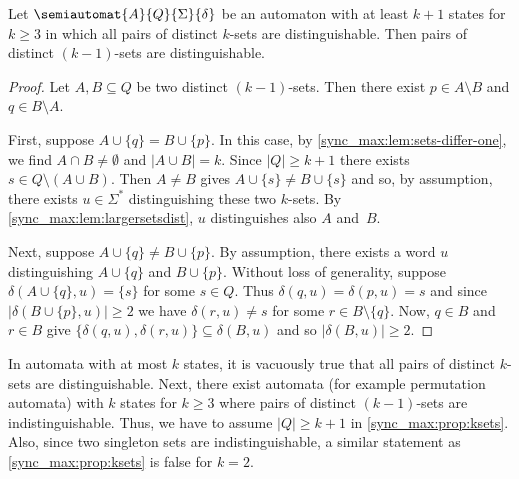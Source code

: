 \begin{proposition} \label{sync_max:prop:ksets}
	Let $\semiautomat{A}{Q}{\Sigma}{\delta}$
	be an automaton with at least $k+1$ 
	states for $k \ge 3$
	in which all pairs of distinct $k$-sets are distinguishable.
	Then pairs of distinct $(k-1)$-sets
	are distinguishable.
\end{proposition}
\begin{proof}
	Let $A,B \subseteq Q$ be two distinct
	$(k-1)$-sets. Then there exist
	$p \in A \setminus B$ and $q \in B \setminus A$.
	
	First, suppose $A \cup \{q\} = B \cup \{p\}$.
	In this case, by \cref{sync_max:lem:sets-differ-one},
	we find $A \cap B \ne \emptyset$
	and $|A \cup B| = k$.
	Since $|Q| \ge k + 1$
	there exists $s \in Q \setminus (A \cup B)$.
	Then $A \ne B$
	gives $A \cup \{s\} \ne B \cup \{s\}$
	and so, by assumption, there exists $u \in \Sigma^*$
	distinguishing these two $k$-sets.
	By \cref{sync_max:lem:largersetsdist}, $u$
	distinguishes also $A$ and~$B$.
	
	Next, suppose $A \cup \{q\} \ne B \cup \{p\}$.
	By assumption, there exists a word $u$ distinguishing
	$A  \cup \{q\}$ and $B  \cup \{p\}$.
	Without loss of generality, suppose $\delta(A \cup \{q\}, u) = \{s\}$
	for some $s \in Q$.
	Thus $\delta(q, u) = \delta(p, u) = s$
	and since $|\delta(B \cup \{p\}, u)| \ge 2$ 
	we have $\delta(r, u) \ne s$ for some $r \in B \setminus \{q\}$.
	Now, $q \in B$ and $r \in B$ 
	give $\{\delta(q, u), \delta(r, u) \} \subseteq \delta(B, u)$
	and so $|\delta(B, u)| \ge 2$.
\end{proof}

In automata with at most $k$ states, it is vacuously true
that all pairs of distinct $k$-sets are distinguishable.
Next, there exist automata (for example permutation automata)
with $k$ states for $k \ge 3$ where pairs of distinct $(k-1)$-sets
are indistinguishable.
Thus, we have to assume $|Q| \ge k + 1$ in \cref{sync_max:prop:ksets}.
Also, since two singleton sets are indistinguishable,
a similar statement as \cref{sync_max:prop:ksets} is false for $k = 2$.

